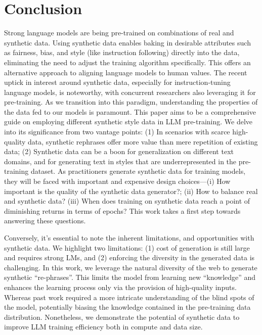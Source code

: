 \documentclass[table]{article}
\begin{document}
\section{Conclusion}
Strong language models are being pre-trained on combinations of real and synthetic data. 
Using synthetic data enables baking in desirable attributes such as fairness, bias, and style (like instruction following) directly into the data, eliminating the need to adjust the training algorithm specifically. This offers an alternative approach to aligning language models to human values. 
The recent uptick in interest around synthetic data, especially for instruction-tuning language models, is noteworthy, with concurrent researchers also leveraging it for pre-training. 
As we transition into this paradigm, understanding the properties of the data fed to our models is paramount. 
This paper aims to be a comprehensive guide on employing different synthetic style data in LLM pre-training. We delve into its significance from two vantage points: (1) In scenarios with scarce high-quality data, synthetic rephrases offer more value than mere repetition of existing data; (2) Synthetic data can be a boon for generalization on different text domains, and for generating text in styles that are underrepresented in the pre-training dataset. 
As practitioners generate synthetic data for training models, they will be faced with important and expensive design choices---(i) How important is the quality of the synthetic data generator?; (ii) How to balance real and synthetic data? (iii) When does training on synthetic data reach a point of diminishing returns in terms of epochs? This work takes a first step towards answering these questions.

Conversely, it's essential to note the inherent limitations, and opportunities with synthetic data. We highlight two limitations: (1) cost of generation is still large and requires strong LMs, and (2) enforcing the diversity in the generated data is challenging.  In this work, we leverage the natural diversity of the web to generate synthetic ``re-phrases''. This limits the model from learning new ``knowledge'' and enhances the learning process only via the provision of high-quality inputs. Whereas past work required a more intricate understanding of the blind spots of the model, potentially biasing the knowledge contained in the pre-training data distribution. Nonetheless, we demonstrate the potential of synthetic data to improve LLM training efficiency both in compute and data size. 
\end{document}
